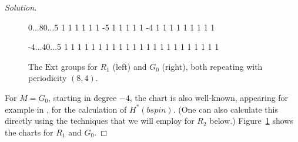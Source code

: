 \documentclass{amsart}
\newcommand{\Ext}{\mathrm{Ext}}
\begin{document}
\begin{proof}[Solution]
\begin{figure}
  \centering
\begin{sseq}[entrysize=5mm, gridstroke=.05pt]{0...8}{0...5}
\ssdropbull
{}
 1
\ssdropbull \ssstroke
{}
 1
\ssdropbull \ssstroke
{} 1
\ssdropbull \ssstroke
{} 1
\ssdropbull \ssstroke
{} 1
\ssdropbull \ssstroke
{} 1
\ssdropbull \ssstroke
{} {-5}
\ssdropbull
{}
 1
\ssdropbull \ssstroke
{} 1
\ssdropbull \ssstroke
{} 1
\ssdropbull \ssstroke
{} 1
\ssdropbull \ssstroke
{} 1
\ssdropbull \ssstroke
{} {-4}
\ssdropbull
{} 1
\ssdropbull \ssstroke
{} 1
\ssdropbull \ssstroke
{} 1
\ssdropbull \ssstroke
{} 1
\ssdropbull \ssstroke
{}
\ssdropbull
{} 1
\ssdropbull \ssstroke
{} 1
\ssdropbull \ssstroke
{} 1
\ssdropbull \ssstroke
{}
\ssdropbull
{} 1
\ssdropbull \ssstroke
{} 1
\ssdropbull \ssstroke
\end{sseq}\qquad
\begin{sseq}[entrysize=5mm, gridstroke=.05pt]{-4...4}{0...5}
\ssdropbull
{} 1
\ssdropbull \ssstroke
{} 1
\ssdropbull \ssstroke
{} 1
\ssdropbull \ssstroke
{} 1
\ssdropbull \ssstroke
{} 1
\ssdropbull \ssstroke
{} 1
\ssdropbull \ssstroke
{} 1
\ssdropbull \ssstroke
{} 1
\ssdropbull \ssstroke
{} 1
\ssdropbull \ssstroke
{}
\ssdropbull
{} 1
\ssdropbull \ssstroke
{} 1
\ssdropbull \ssstroke
{} 1
\ssdropbull \ssstroke
{} 1
\ssdropbull \ssstroke
{} 1
\ssdropbull \ssstroke
{} 1
\ssdropbull \ssstroke
{} 1
\ssdropbull \ssstroke
{} 1
\ssdropbull \ssstroke
{}
 1
\ssdropbull \ssstroke
{} 1
\ssdropbull \ssstroke
{}
\ssdropbull
{} 1
\ssdropbull \ssstroke
{} 1
\ssdropbull \ssstroke
{} 1
\ssdropbull \ssstroke
{} 1
\ssdropbull \ssstroke
\end{sseq}
\caption{The $\Ext$ groups for $R_1$ (left) and $G_0$ (right), both repeating with periodicity $(8,4)$.}
\label{fig:R1}
\end{figure}

For $M = G_0$, starting in degree $-4$, the chart is also well-known, appearing for example in \cite[Figure 12]{RognesNotes}, for the calculation of $H^*(b spin)$. (One can also calculate this directly using the techniques that we will employ for $R_2$ below.) Figure~\ref{fig:R1} shows the charts for $R_1$ and $G_0$.


\end{proof}
\end{document}
